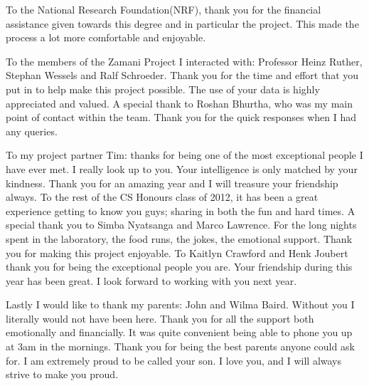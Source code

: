 \documentclass[12pt,a4paper]{report}
\begin{document}
To the National Research Foundation(NRF), thank you for the financial assistance
given towards this degree and in particular the project. This made the process
a lot more comfortable and enjoyable.

To the members of the Zamani Project I
interacted with: Professor Heinz Ruther, Stephan Wessels and Ralf Schroeder. 
Thank you for the time and effort that you put in to help make this project
possible. The use of your data is highly appreciated and valued. A special thank 
to Roshan Bhurtha, who was my main point of contact within the team. Thank you
for the quick responses when I had any queries.

To my project partner Tim: thanks for being one of the most exceptional people I
have ever met. I really look up to you. Your intelligence is only matched by
your kindness. Thank you for an amazing year and I will treasure your friendship
always. To the rest of the CS Honours class of 2012, it has been a great
experience getting to know you guys; sharing in both the fun and hard times. 
A special thank you to Simba Nyatsanga and Marco Lawrence. For
the long nights spent in the laboratory, the food runs, the jokes, the emotional
support. Thank you for making this project enjoyable. To Kaitlyn Crawford and 
Henk Joubert thank you for being the exceptional people you are. Your friendship
during this year has been great. I look forward to working with you next year.

Lastly I would like to thank my parents: John and Wilma Baird. Without you I
literally would not have been here. Thank you for all the support both
emotionally and financially. It was quite convenient being able to phone you up
at 3am in the mornings. Thank you for being the best parents anyone could ask
for. I am extremely proud to be called your son. I love you, and I will always
strive to make you proud.



\tableofcontents
\newpage
\listoffigures
\newpage
{}



 











{}

\appendix

\end{document}
